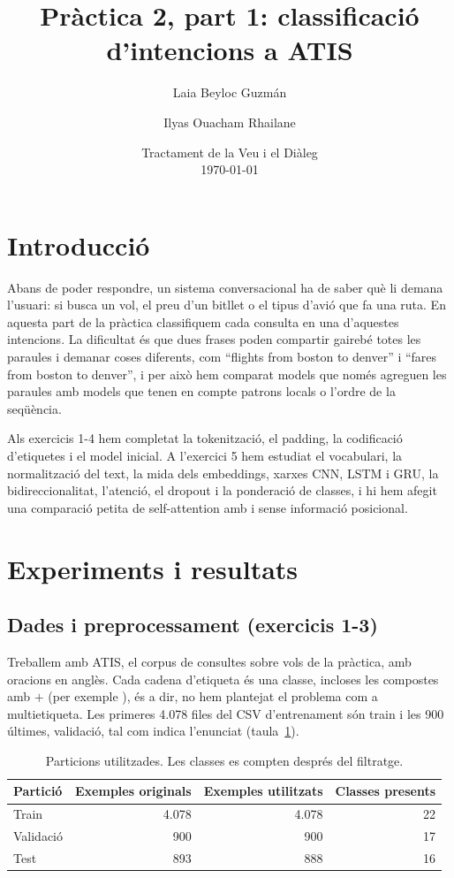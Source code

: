 \documentclass[11pt,a4paper]{article}
\title{Pràctica 2, part 1: classificació d'intencions a ATIS}
\author{Laia Beyloc Guzmán \and Ilyas Ouacham Rhailane}
\date{Tractament de la Veu i el Diàleg\\[4pt]\today}
\newcommand{\intent}[1]{\texttt{\detokenize{#1}}}
\begin{document}
\maketitle

\section{Introducció}
\label{sec:intro}

Abans de poder respondre, un sistema conversacional ha de saber què li demana l'usuari: si busca un vol, el preu
d'un bitllet o el tipus d'avió que fa una ruta. En aquesta part de la pràctica classifiquem cada consulta en una
d'aquestes intencions. La dificultat és que dues frases poden compartir gairebé totes les paraules i demanar
coses diferents, com ``flights from boston to denver'' i ``fares from boston to denver'', i per això hem comparat
models que només agreguen les paraules amb models que tenen en compte patrons locals o l'ordre de la seqüència.

Als exercicis 1-4 hem completat la tokenització, el padding, la codificació d'etiquetes i el model inicial. A
l'exercici 5 hem estudiat el vocabulari, la normalització del text, la mida dels embeddings, xarxes CNN, LSTM i GRU,
la bidireccionalitat, l'atenció, el dropout i la ponderació de classes, i hi hem afegit una comparació petita de
self-attention amb i sense informació posicional.

\section{Experiments i resultats}
\label{sec:experiments}

\subsection{Dades i preprocessament (exercicis 1-3)}
\label{sec:dades}

Treballem amb ATIS, el corpus de consultes sobre vols de la pràctica, amb oracions en anglès. Cada cadena
d'etiqueta és una classe, incloses les compostes amb \(+\) (per exemple \intent{flight+airfare}), és a dir, no
hem plantejat el problema com a multietiqueta. Les primeres 4.078 files del CSV d'entrenament són train i les 900
últimes, validació, tal com indica l'enunciat (taula~\ref{tab:particions}).

\begin{table}[ht]
\centering\small
\caption{Particions utilitzades. Les classes es compten després del filtratge.}
\label{tab:particions}
\begin{tabular}{lrrr}
\toprule
Partició & Exemples originals & Exemples utilitzats & Classes presents\\
\midrule
Train & 4.078 & 4.078 & 22\\
Validació & 900 & 900 & 17\\
Test & 893 & 888 & 16\\
\bottomrule
\end{tabular}
\end{table}
\end{document}
